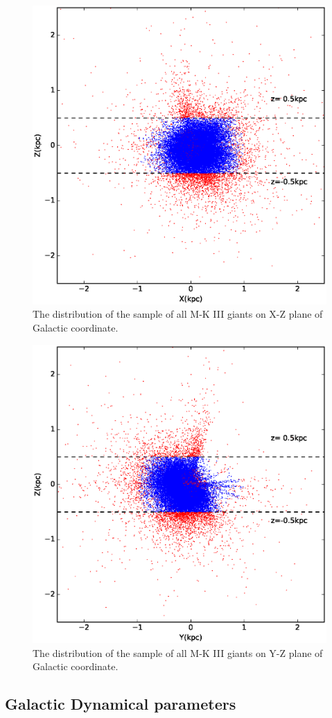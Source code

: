 \documentclass[onecolumn]{aa}   %
\begin{document}
\begin{figure}[hbtp]
  \centering
  \includegraphics[width=0.5\columnwidth]{figures/XZ_mk.eps}  %
  \caption[]{\label{fig: XZ_mk}
  The distribution of the sample of all M-K III giants on X-Z plane of Galactic coordinate.
  }
 \end{figure}
  
\begin{figure}[hbtp]
  \centering
  \includegraphics[width=0.5\columnwidth]{figures/YZ_mk.eps}  %
  \caption[]{\label{fig: YZ_mk}
  The distribution of the sample of all M-K III giants on Y-Z plane of Galactic coordinate.
  }
  \end{figure}
  
\subsection{Galactic Dynamical parameters}  \label{sec:GD}
\end{document}
